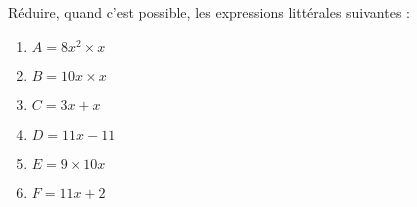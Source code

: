 \begin{minipage}{0.99\linewidth}

\exo

Réduire, quand c'est possible, les expressions littérales suivantes :


\begin{enumerate}

	\item $A=8x^2\times x$
	\item $B=10x \times x$
	\item $C=3x+x$
	\item $D=11x-11$
	\item $E=9\times10x$
	\item $F=11x+2$


\end{enumerate}

\end{minipage}

\vspace{0.5cm}
